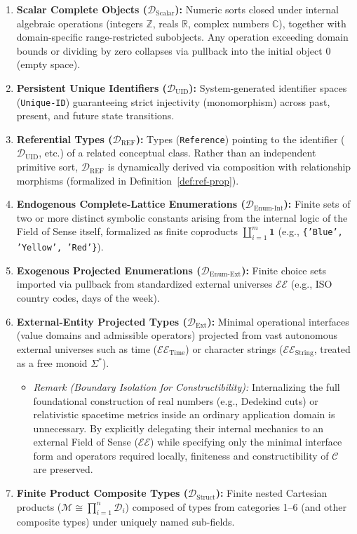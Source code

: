\documentclass[11pt,a4paper]{article}
\theoremstyle{definition}
\theoremstyle{plain}
\theoremstyle{remark}
\newcommand{\Dscalar}{\mathcal{D}_{\mathrm{Scalar}}}
\newcommand{\Duid}{\mathcal{D}_{\mathrm{UID}}}
\newcommand{\Dref}{\mathcal{D}_{\mathrm{REF}}}
\newcommand{\Denumint}{\mathcal{D}_{\mathrm{Enum\text{-}Int}}}
\newcommand{\Denumext}{\mathcal{D}_{\mathrm{Enum\text{-}Ext}}}
\newcommand{\Dext}{\mathcal{D}_{\mathrm{Ext}}}
\newcommand{\Dstruct}{\mathcal{D}_{\mathrm{Struct}}}
\begin{document}
\begin{enumerate}
    \item \textbf{Scalar Complete Objects ($\Dscalar$):} Numeric sorts closed under internal algebraic operations (integers $\mathbb{Z}$, reals $\mathbb{R}$, complex numbers $\mathbb{C}$), together with domain-specific range-restricted subobjects. Any operation exceeding domain bounds or dividing by zero collapses via pullback into the initial object $0$ (empty space).
    \item \textbf{Persistent Unique Identifiers ($\Duid$):} System-generated identifier spaces (\texttt{Unique-ID}) guaranteeing strict injectivity (monomorphism) across past, present, and future state transitions.
    \item \textbf{Referential Types ($\Dref$):} Types (\texttt{Reference}) pointing to the identifier ($\Duid$, etc.) of a related conceptual class. Rather than an independent primitive sort, $\Dref$ is dynamically derived via composition with relationship morphisms (formalized in Definition~\ref{def:ref-prop}).
    \item \textbf{Endogenous Complete-Lattice Enumerations ($\Denumint$):} Finite sets of two or more distinct symbolic constants arising from the internal logic of the Field of Sense itself, formalized as finite coproducts $\coprod_{i=1}^m \mathbf{1}$ (e.g., \texttt{\{'Blue', 'Yellow', 'Red'\}}).
    \item \textbf{Exogenous Projected Enumerations ($\Denumext$):} Finite choice sets imported via pullback from standardized external universes $\mathcal{EE}$ (e.g., ISO country codes, days of the week).
    \item \textbf{External-Entity Projected Types ($\Dext$):} Minimal operational interfaces (value domains and admissible operators) projected from vast autonomous external universes such as time ($\mathcal{EE}_{\mathrm{Time}}$) or character strings ($\mathcal{EE}_{\mathrm{String}}$, treated as a free monoid $\Sigma^*$).
    \begin{itemize}
        \item \emph{Remark (Boundary Isolation for Constructibility):} Internalizing the full foundational construction of real numbers (e.g., Dedekind cuts) or relativistic spacetime metrics inside an ordinary application domain is unnecessary. By explicitly delegating their internal mechanics to an external Field of Sense ($\mathcal{EE}$) while specifying only the minimal interface form and operators required locally, finiteness and constructibility of $\mathcal{C}$ are preserved.
    \end{itemize}
    \item \textbf{Finite Product Composite Types ($\Dstruct$):} Finite nested Cartesian products ($\mathcal{M} \cong \prod_{i=1}^n \mathcal{D}_i$) composed of types from categories 1--6 (and other composite types) under uniquely named sub-fields.
\end{enumerate}
\end{document}
